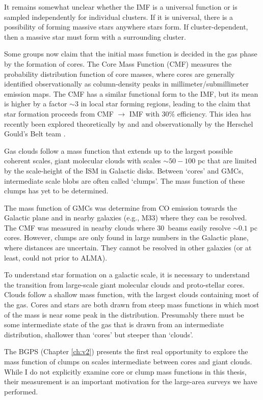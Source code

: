 It remains somewhat unclear whether the IMF is a universal function or is sampled
independently for individual clusters.  If it is universal, there is a possibility of
forming massive stars anywhere stars form.  If cluster-dependent, then a massive star
must form with a surrounding cluster.

Some groups now claim that the initial mass function is decided in the gas
phase by the formation of cores.  The Core Mass Function (CMF) measures the
probability distribution function of core masses, where cores are generally
identified observationally as column-density peaks in millimeter/submillimeter
emission maps.  The CMF has a similar functional form to the IMF, but its mean
is higher by a factor $\sim3$ in local star forming regions, leading to the claim
that star formation proceeds from CMF $\rightarrow$ IMF with 30\% efficiency.
This idea has recently been explored theoretically by \citet{Chabrier2010a} and
\citet{Hopkins2012b} and observationally by the Herschel Gould's Belt team
\citep{Arzoumanian2011a,Andre2010a}.

Gas clouds follow a mass function that extends up to the largest
possible coherent scales, giant molecular clouds with scales $\sim50-100$ pc
that are limited by the scale-height of the ISM in Galactic disks.
Between `cores' and GMCs, intermediate scale blobs are often called `clumps'. 
The mass function of these clumps has yet to be determined.  

The mass function of GMCs was determine from CO emission towards the Galactic
plane and in nearby galaxies (e.g., M33) where they can be resolved.  The CMF
was measured in nearby clouds where 30\arcsec\ beams easily resolve $\sim0.1$
pc cores.  However, clumps are only found in large numbers in the Galactic
plane, where distances are uncertain.  They cannot be resolved in other
galaxies (or at least, could not prior to ALMA).

To understand star formation on a galactic scale, it is necessary to understand
the transition from large-scale giant molecular clouds and proto-stellar cores.
Clouds follow a shallow mass function, with the largest clouds containing most
of the gas.  Cores and stars are both drawn from steep mass functions in which
most of the mass is near some peak in the distribution.  Presumably there must be
some intermediate state of the gas that is drawn from an intermediate
distribution, shallower than `cores' but steeper than `clouds'.  

The BGPS (Chapter \ref{ch:v2}) presents the first real opportunity to explore
the mass function of clumps on scales intermediate between cores and giant
clouds.   While I do not explicitly examine core or clump mass functions in this
thesis, their measurement is an important motivation for the large-area surveys
we have performed.

